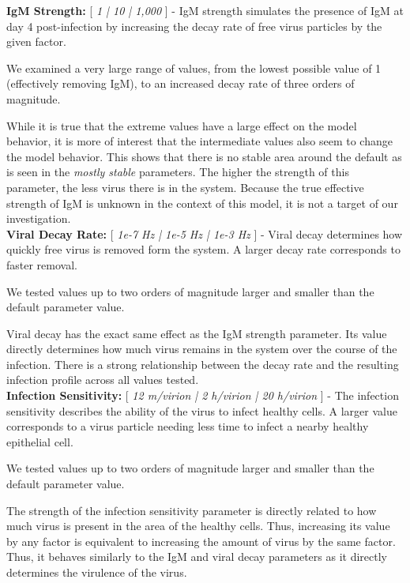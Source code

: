 \documentclass[10pt]{article}
\begin{document}
\textbf{IgM Strength:} [ \textit{1 | 10 | 1,000} ] - IgM strength simulates the presence of IgM at day 4 post-infection by increasing the decay rate of free virus particles by the given factor.

We examined a very large range of values, from the lowest possible value of 1 (effectively removing IgM), to an increased decay rate of three orders of magnitude.

While it is true that the extreme values have a large effect on the model behavior, it is more of interest that the intermediate values also seem to change the model behavior.  This shows that there is no stable area around the default as is seen in the \textit{mostly stable} parameters.  The higher the strength of this parameter, the less virus there is in the system.  Because the true effective strength of IgM is unknown in the context of this model, it is not a target of our investigation. \\


\textbf{Viral Decay Rate:} [ \textit{1e-7 Hz | 1e-5 Hz | 1e-3 Hz} ] - Viral decay determines how quickly free virus is removed form the system.  A larger decay rate corresponds to faster removal.

We tested values up to two orders of magnitude larger and smaller than the default parameter value.

Viral decay has the exact same effect as the IgM strength parameter.  Its value directly determines how much virus remains in the system over the course of the infection.  There is a strong relationship between the decay rate and the resulting infection profile across all values tested. \\


\textbf{Infection Sensitivity:} [ \textit{12 m/virion | 2 h/virion | 20 h/virion} ] - The infection sensitivity describes the ability of the virus to infect healthy cells.  A larger value corresponds to a virus particle needing less time to infect a nearby healthy epithelial cell.

We tested values up to two orders of magnitude larger and smaller than the default parameter value.

The strength of the infection sensitivity parameter is directly related to how much virus is present in the area of the healthy cells.  Thus, increasing its value by any factor is equivalent to increasing the amount of virus by the same factor.  Thus, it behaves similarly to the IgM and viral decay parameters as it directly determines the virulence of the virus. \\
\end{document}
